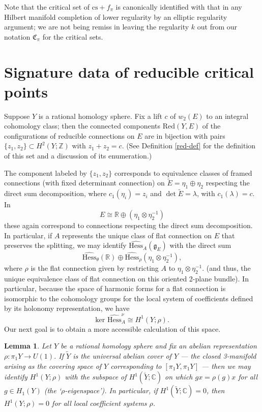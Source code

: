 \documentclass{memo-l}
\newtheorem{lemma}[theorem]{Lemma}
\theoremstyle{definition}
\theoremstyle{remark}
\numberwithin{section}{chapter}
\numberwithin{equation}{chapter}
\begin{document}
Note that the critical set of $\text{cs}+f_\pi$ is canonically identified with that in any Hilbert manifold completion of lower regularity by an elliptic regularity argument; we are not being remiss in leaving the regularity $k$ out from our notation $\mathfrak C_\pi$ for the critical sets.

\section{Signature data of reducible critical points}\label{sec:3d-sigdata}
Suppose $Y$ is a rational homology sphere. Fix a lift $c$ of $w_2(E)$ to an integral cohomology class; then the connected components $\text{Red}(Y,E)$ of the configurations of reducible connections on $E$ are in bijection with pairs $\{z_1, z_2\} \subset H^2(Y;\mathbb Z)$ with $z_1 + z_2 = c$. (See Definition \ref{red-def} for the definition of this set and a discussion of its enumeration.) 

The component labeled by $\{z_1, z_2\}$ corresponds to equivalence classes of framed connections (with fixed determinant connection) on $\tilde E = \eta_1 \oplus \eta_2$ respecting the direct sum decomposition, where $c_1(\eta_i) = z_i$ and $\det \tilde E = \lambda$, with $c_1(\lambda) = c$. In 
$$E \cong \mathbb R \oplus (\eta_1 \otimes \eta_2^{-1})$$ 
these again correspond to connections respecting the direct sum decomposition. In particular, if $A$ represents the unique class of flat connection on $E$ that preserves the splitting, we may identify $\widehat{\text{Hess}}_A(\mathfrak g_E)$ with the direct sum 
$$\widehat{\text{Hess}}_\theta(\mathbb R) \oplus \widehat{\text{Hess}}_\rho(\eta_1 \otimes \eta_2^{-1}),$$ 
where $\rho$ is the flat connection given by restricting $A$ to $\eta_1 \otimes \eta_2^{-1}$. (and thus, the unique equivalence class of flat connection on this oriented 2-plane bundle). In particular, because the space of harmonic forms for a flat connection is isomorphic to the cohomology groups for the local system of coefficients defined by its holonomy representation, we have $$\text{ker } \widehat{\text{Hess}}^\nu_A \cong H^1(Y;\rho).$$ Our next goal is to obtain a more accessible calculation of this space.

\begin{lemma}Let $Y$ be a rational homology sphere and fix an abelian representation $\rho: \pi_1 Y \to U(1)$. If $\tilde Y$ is the universal abelian cover of $Y$ --- the closed 3-manifold arising as the covering space of $Y$ corresponding to $[\pi_1 Y, \pi_1 Y]$ --- then we may identify $H^1(Y; \rho)$ with the subspace of $H^1(\tilde Y; \mathbb C)$ on which $gx = \rho(g) x$ for all $g \in H_1(Y)$ (the `$\rho$-eigenspace'). In particular, if $H^1(\tilde Y; \mathbb C) = 0$, then $H^1(Y; \rho) = 0$ for all local coefficient systems $\rho$.
\end{lemma}
\end{document}
